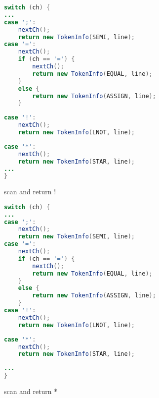 \documentclass[8pt,a4paper,compress]{beamer}
\begin{document}
\begin{frame}[fragile]
\begin{overprint}
\begin{tcolorbox}[enhanced,drop shadow southwest,sharp corners,size=fbox,colback=white,fontlower=\small\ttfamily,collower=silver900]
\begin{lstlisting}[language=Java,style=focusout]
switch (ch) {
...
case ';':
    nextCh();             
    return new TokenInfo(SEMI, line);         
case '=':             
    nextCh();             
    if (ch == '=') {                 
        nextCh();                 
        return new TokenInfo(EQUAL, line);             
    }             
    else {                 
        return new TokenInfo(ASSIGN, line);             
    }         
\end{lstlisting}
\begin{lstlisting}[language=Java,style=focusin,backgroundcolor=\color{lime100}]
case '!':             
    nextCh();             
    return new TokenInfo(LNOT, line);         
\end{lstlisting}
\begin{lstlisting}[language=Java,style=focusout]
case '*':             
    nextCh();             
    return new TokenInfo(STAR, line);
...
}
\end{lstlisting}

\tcblower
\begin{minipage}[t][.25cm][t]{\textwidth}
scan and return !
\end{minipage}
\end{tcolorbox}

\begin{tcolorbox}[enhanced,drop shadow southwest,sharp corners,size=fbox,colback=white,fontlower=\small\ttfamily,collower=silver900]

\begin{lstlisting}[language=Java,style=focusout]
switch (ch) {
...
case ';':
    nextCh();             
    return new TokenInfo(SEMI, line);         
case '=':             
    nextCh();             
    if (ch == '=') {                 
        nextCh();                 
        return new TokenInfo(EQUAL, line);             
    }             
    else {                 
        return new TokenInfo(ASSIGN, line);             
    }         
case '!':             
    nextCh();             
    return new TokenInfo(LNOT, line);         
\end{lstlisting}
\begin{lstlisting}[language=Java,style=focusin,backgroundcolor=\color{lime100}]
case '*':             
    nextCh();             
    return new TokenInfo(STAR, line);
\end{lstlisting}
\begin{lstlisting}[language=Java,style=focusout]
...
}
\end{lstlisting}

\tcblower
\begin{minipage}[t][.25cm][t]{\textwidth}
scan and return *
\end{minipage}
\end{tcolorbox}

\end{overprint}
\end{frame}
\end{document}
